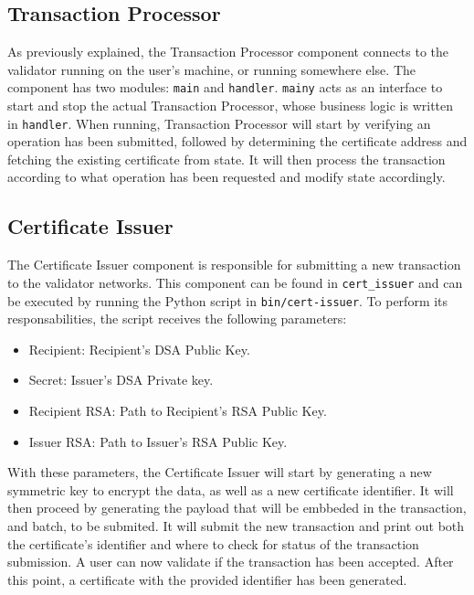 \subsection{Transaction Processor}
\label{sec:implementation-tp}

As previously explained, the Transaction Processor component connects to the validator running on the user's machine, or running somewhere else. The component has two modules: \texttt{main} and \texttt{handler}. \texttt{mainy} acts as an interface to start and stop the actual Transaction Processor, whose business logic is written in \texttt{handler}. When running, Transaction Processor will start by verifying an operation has been submitted, followed by determining the certificate address and fetching the existing certificate from state. It will then process the transaction according to what operation has been requested and modify state accordingly.

\subsection{Certificate Issuer}

The Certificate Issuer component is responsible for submitting a new transaction to the validator networks. This component can be found in \texttt{cert\_issuer} and can be executed by running the Python script in \texttt{bin/cert-issuer}. To perform its responsabilities, the script receives the following parameters:

\begin{itemize}
	\item Recipient: Recipient's DSA Public Key.
	\item Secret: Issuer's DSA Private key.
	\item Recipient RSA: Path to Recipient's RSA Public Key.
	\item Issuer RSA: Path to Issuer's RSA Public Key.
\end{itemize}

With these parameters, the Certificate Issuer will start by generating a new symmetric key to encrypt the data, as well as a new certificate identifier. It will then proceed by generating the payload that will be embbeded in the transaction, and batch, to be submited. It will submit the new transaction and print out both the certificate's identifier and where to check for status of the transaction submission. A user can now validate if the transaction has been accepted. After this point, a certificate with the provided identifier has been generated.

